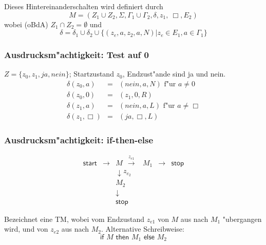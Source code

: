 \documentclass[german, 10pt, a4paper, twocolumn]{scrartcl}
\theoremstyle{definition}
\theoremstyle{example}
\begin{document}
Dieses Hintereinanderschalten wird definiert durch
\begin{displaymath}
	M = (Z_1 \cup Z_2, \Sigma, \Gamma_1 \cup \Gamma_2, \delta, z_1, \ \Box, E_2)
\end{displaymath}
wobei (oBdA) $Z_1 \cap Z_2 = \emptyset$ und
\begin{displaymath}
	\delta = \delta_1 \cup \delta_2 \cup \{ (z_e, a, z_2, a, N) | z_e \in E_1, a \in \Gamma_1 \}
\end{displaymath}

\subsubsection{Ausdrucksm"achtigkeit: Test auf 0}

$Z = \{ z_0, z_1, \textit{ja}, \textit{nein} \}$; Startzustand $z_0$, Endzust"ande sind ja und nein.
\begin{eqnarray*}
	\delta(z_0, a) &	= &	(\textit{nein}, a, N) \text{ f"ur } a \neq 0\\
	\delta(z_0, 0) &	= &	(z_1, 0, R)\\
	\delta(z_1, a) &	= &	(\textit{nein}, a, L) \text{ f"ur } a \neq \Box \\
	\delta(z_1, \Box) &	= &	(\textit{ja}, \Box, L)
\end{eqnarray*}

\subsubsection{Ausdrucksm"achtigkeit: if-then-else}

\begin{displaymath}
	\begin{array}{llllll}
		\textsf{start} &	\longrightarrow &	M \ \ \overset{z_{e1}}{\longrightarrow} &	M_1 &	\longrightarrow &	\textsf{stop} \\
		&			&			\downarrow z_{e_2}\\
		&			&			M_2\\
		&			&			\downarrow\\
		&			&			\textsf{stop}
	\end{array}
\end{displaymath}

Bezeichnet eine TM, wobei vom Endzustand $z_{e1}$ von $M$ aus nach $M_1$ "ubergangen wird, und von $z_{e2}$ aus nach $M_2$. Alternative Schreibweise:
\begin{displaymath}
	\textsf{if }  M \textsf{ then } M_1 \textsf{ else } M_2
\end{displaymath}
\end{document}
